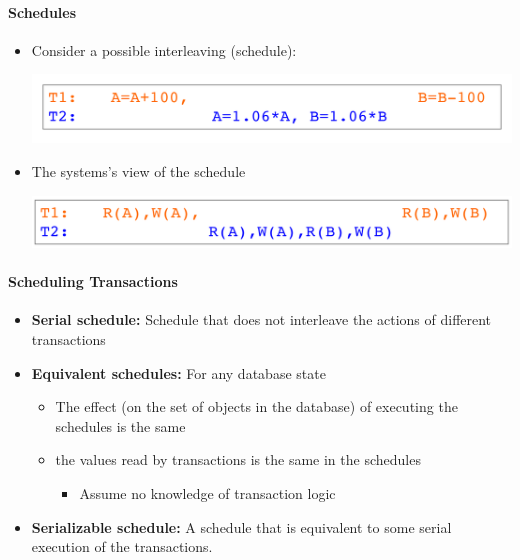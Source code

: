 \paragraph{Schedules}
\begin{itemize}
\item Consider a possible interleaving (schedule):

  \includegraphics[scale=0.15]{graphics/schedule-1.png}

\item The systems's view of the schedule

  \includegraphics[scale=0.15]{graphics/schedule-2.png}
\end{itemize}

\paragraph{Scheduling Transactions}
\begin{itemize}
\item \textbf{Serial schedule:} Schedule that does not
  interleave the actions of different transactions


\item \textbf{Equivalent schedules:} For any database state
  \begin{itemize}
  \item The effect (on the set of objects in the database) of
    executing the schedules is the same
  \item the values read by transactions is the same in the
    schedules
    \begin{itemize}
    \item Assume no knowledge of transaction logic
    \end{itemize}
  \end{itemize}

\item \textbf{Serializable schedule:} A schedule that is equivalent
  to some serial execution of the transactions.
\end{itemize}

